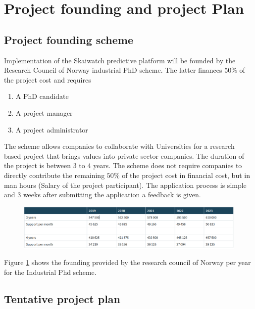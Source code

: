 \documentclass[10pt,a4paper]{article}
\begin{document}
\section{Project founding and project Plan}
\subsection{Project founding scheme}
Implementation of the Skaiwatch predictive platform will be founded by the Research Council of Norway industrial PhD scheme. The latter finances 50$\%$ of the project cost and requires 

\begin{enumerate}
	\item A PhD candidate
	\item A project manager
	\item A project administrator
\end{enumerate}
The scheme allows companies to collaborate with Universities for a research based project that brings values into private sector companies. The duration of the project is between 3 to 4 years.
\justify
The scheme does not require companies to directly contribute the remaining $50\%$ of the project cost in financial cost, but in man hours (Salary of the project participant). The application process is simple and 3 weeks after submitting the application a feedback is given. 
\begin{figure}[H]
	\centering
	\includegraphics[width=1.\linewidth]{table}
	\caption{}
	\label{fig:table}
\end{figure}

Figure \ref{fig:table} shows the founding provided by the research council of Norway per year for the Industrial Phd scheme.
\subsection{Tentative project plan} 
\clearpage
\end{document}
